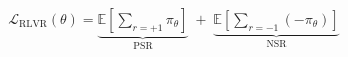 \documentclass[preview]{standalone}
\begin{document}
\begin{align*}
\mathcal{L}_{\mathrm{RLVR}}(\theta) =  \underbrace{\mathbb{E}\!\left[\sum_{r=+1}\pi_\theta\right]}_{\text{PSR}} \;+\; \underbrace{\mathbb{E}\!\left[\sum_{r=-1}(-\pi_\theta)\right]}_{\text{NSR}}
\end{align*}
\end{document}
